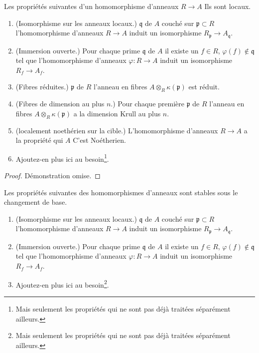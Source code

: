 \begin{lemma}

\label{lemma-properties-local}

Les propriétés suivantes d'un homomorphisme d'anneaux $R \to A$ Ils sont locaux.

\begin{enumerate}

\item (Isomorphisme sur les anneaux locaux.) $\mathfrak q$ de $A$ couché sur $\mathfrak p \subset R$
l'homomorphisme d'anneaux $R \to A$ induit un isomorphisme
$R_{\mathfrak p} \to A_{\mathfrak q}$.
\item (Immersion ouverte.) Pour chaque prime $\mathfrak q$ de $A$ il existe un $f \in R$,
$\varphi(f) \not \in \mathfrak q$ tel que l'homomorphisme d'anneaux $\varphi : R \to A$
induit un isomorphisme $R_f \to A_f$.
\item (Fibres réduites.) $\mathfrak p$ de $R$ l'anneau en fibres
$A \otimes_R \kappa(\mathfrak p)$ est réduit.
\item (Fibres de dimension au plus $n$.) Pour chaque première $\mathfrak p$ de $R$ l'anneau en fibres
$A \otimes_R \kappa(\mathfrak p)$ a la dimension Krull au plus $n$.
\item (localement noethérien sur la cible.) L'homomorphisme d'anneaux $R \to A$ a la propriété qui $A$ C'est Noétherien.
\item Ajoutez-en plus ici au besoin\footnote{Mais seulement les propriétés qui ne sont pas déjà traitées séparément ailleurs.}.

\end{enumerate}

\end{lemma}

\begin{proof}
Démonstration omise.
\end{proof}

\begin{lemma}

\label{lemma-properties-base-change}

Les propriétés suivantes des homomorphismes d'anneaux sont stables sous le changement de base.

\begin{enumerate}

\item (Isomorphisme sur les anneaux locaux.) $\mathfrak q$ de $A$ couché sur $\mathfrak p \subset R$
l'homomorphisme d'anneaux $R \to A$ induit un isomorphisme
$R_{\mathfrak p} \to A_{\mathfrak q}$.
\item (Immersion ouverte.) Pour chaque prime $\mathfrak q$ de $A$ il existe un $f \in R$,
$\varphi(f) \not \in \mathfrak q$ tel que l'homomorphisme d'anneaux $\varphi : R \to A$
induit un isomorphisme $R_f \to A_f$.
\item Ajoutez-en plus ici au besoin\footnote{Mais seulement les propriétés qui ne sont pas déjà traitées séparément ailleurs.}.

\end{enumerate}

\end{lemma}

